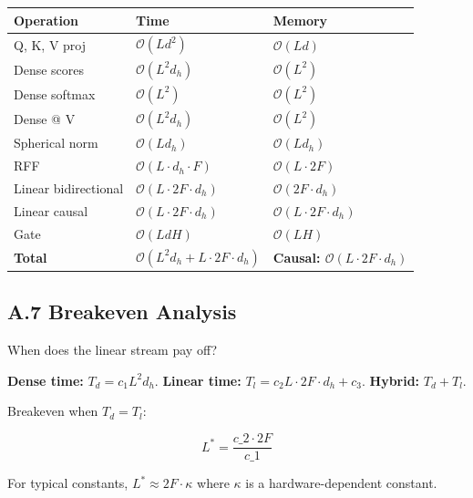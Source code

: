 \begin{table}[H]
\centering
\small
\begin{tabular}{lll}
\toprule
\textbf{Operation} & \textbf{Time} & \textbf{Memory} \\
\midrule
Q, K, V proj & $\mathcal{O}(L d^2)$ & $\mathcal{O}(L d)$ \\
Dense scores & $\mathcal{O}(L^2 d_h)$ & $\mathcal{O}(L^2)$ \\
Dense softmax & $\mathcal{O}(L^2)$ & $\mathcal{O}(L^2)$ \\
Dense @ V & $\mathcal{O}(L^2 d_h)$ & $\mathcal{O}(L^2)$ \\
Spherical norm & $\mathcal{O}(L d_h)$ & $\mathcal{O}(L d_h)$ \\
RFF & $\mathcal{O}(L \cdot d_h \cdot F)$ & $\mathcal{O}(L \cdot 2F)$ \\
Linear bidirectional & $\mathcal{O}(L \cdot 2F \cdot d_h)$ & $\mathcal{O}(2F \cdot d_h)$ \\
Linear causal & $\mathcal{O}(L \cdot 2F \cdot d_h)$ & $\mathcal{O}(L \cdot 2F \cdot d_h)$ \\
Gate & $\mathcal{O}(L d H)$ & $\mathcal{O}(L H)$ \\
\textbf{Total} & \textbf{$\mathcal{O}(L^2 d_h + L \cdot 2F \cdot d_h)$} & \textbf{Causal: $\mathcal{O}(L \cdot 2F \cdot d_h)$} \\
\bottomrule
\end{tabular}
\end{table}

\subsection{A.7 Breakeven Analysis}

When does the linear stream pay off?

\textbf{Dense time:} $T_d = c_1 L^2 d_h$.
\textbf{Linear time:} $T_l = c_2 L \cdot 2F \cdot d_h + c_3$.
\textbf{Hybrid:} $T_d + T_l$.

Breakeven when $T_d = T_l$:

\[
L^* = \frac{c\_2 \cdot 2F}{c\_1}
\]

For typical constants, $L^* \approx 2F \cdot \kappa$ where $\kappa$ is a 
hardware-dependent constant.

